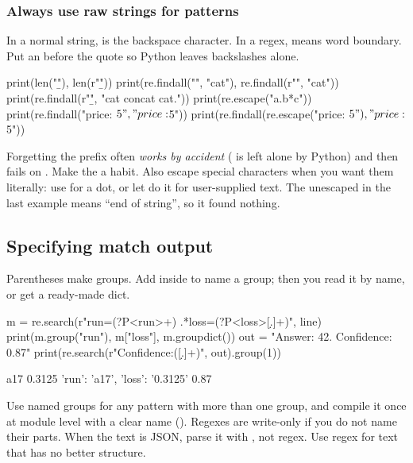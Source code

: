 \subsubsection*{Always use raw strings for patterns}

In a normal string,  is the backspace character. In a regex,
 means word boundary. Put an  before the quote so Python leaves
backslashes alone.

\begin{pycode}
print(len("\b"), len(r"\b"))
print(re.findall("\bcat", "cat"), re.findall(r"\bcat", "cat"))
print(re.findall(r"\bcat\b", "cat concat cat."))
print(re.escape("a.b*c"))
print(re.findall("price: $5", "price: $5"))
print(re.findall(re.escape("price: $5"), "price: $5"))
\end{pycode}

\begin{trap}
Forgetting the  prefix often \emph{works by accident} ( is
left alone by Python) and then fails on . Make the  a habit.
Also escape special characters when you want them literally: use  for a
dot, or let  do it for user-supplied text. The unescaped \code{\$} in the last
example means ``end of string'', so it found nothing.
\end{trap}

\subsection{Specifying match output}

Parentheses make groups. Add  inside to name a group; then you read it by
name, or get a ready-made dict.

\begin{pycode}
m = re.search(r"run=(?P<run>\w+) .*loss=(?P<loss>[\d.]+)", line)
print(m.group("run"), m["loss"], m.groupdict())
out = "Answer: 42. Confidence: 0.87"
print(re.search(r"Confidence:\s*([\d.]+)", out).group(1))
\end{pycode}
\begin{rawcode}
a17 0.3125 {'run': 'a17', 'loss': '0.3125'}
0.87
\end{rawcode}

\begin{gamerule}
Use named groups for any pattern with more than one group, and compile it once at module level
with a clear name (). Regexes are write-only if you do not name their parts.
When the text is JSON, parse it with , not regex. Use regex for text that has no
better structure.
\end{gamerule}

